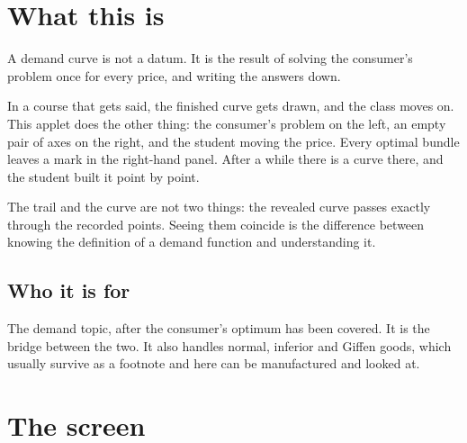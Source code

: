 \documentclass[11pt,a4paper]{appletmanual}
\begin{document}

\manualtoc
\thispagestyle{empty}
\clearpage
\setcounter{page}{1}

\section{What this is}

A demand curve is not a datum. It is the result of solving the consumer's
problem once for every price, and writing the answers down.

In a course that gets said, the finished curve gets drawn, and the class moves
on. This applet does the other thing: the consumer's problem on the left, an
empty pair of axes on the right, and the student moving the price. Every
optimal bundle leaves a mark in the right-hand panel. After a while there is a
curve there, and the student built it point by point.


\begin{amkey}
The trail and the curve are not two things: the revealed curve passes exactly
through the recorded points. Seeing them coincide is the difference between
knowing the definition of a demand function and understanding it.
\end{amkey}

\subsection{Who it is for}

The demand topic, after the consumer's optimum has been covered. It is the
bridge between the two. It also handles normal, inferior and Giffen goods,
which usually survive as a footnote and here can be manufactured and looked at.



\section{The screen}
\end{document}
